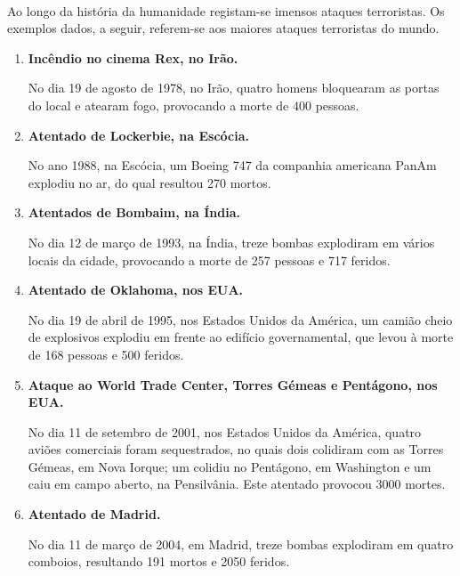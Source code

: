 \documentclass{report}
\begin{document}
\paragraph{} Ao longo da história da humanidade registam-se imensos ataques terroristas. Os exemplos dados, a seguir, referem-se aos maiores ataques terroristas do mundo.\par
\begin{enumerate}
 \item \textbf{Incêndio no cinema Rex, no Irão.} 
 
No dia 19 de agosto de 1978, no Irão, quatro homens bloquearam as portas do local e atearam fogo, provocando a morte de 400 pessoas.
\\
  
 \item \textbf{Atentado de Lockerbie, na Escócia.}
 
No ano 1988, na Escócia, um Boeing 747 da companhia americana PanAm explodiu no ar, do qual resultou 270 mortos.
\\

 \item \textbf{Atentados de Bombaim, na Índia.}
 
No dia 12 de março de 1993, na Índia, treze bombas explodiram em vários locais da cidade, provocando a morte de 257 pessoas e 717 feridos.
\\
 
 \item \textbf{Atentado de Oklahoma, nos EUA.}
 
No dia 19 de abril de 1995, nos Estados Unidos da América, um camião cheio de explosivos explodiu em frente ao edifício governamental, que levou à morte de 168 pessoas e 500 feridos.
\\
 	
 \item \textbf{Ataque ao World Trade Center, Torres Gémeas e Pentágono,
nos EUA.
}	

No dia 11 de setembro de 2001, nos Estados Unidos da América, quatro aviões comerciais foram sequestrados, no quais dois colidiram com as Torres Gémeas, em Nova Iorque; um colidiu no Pentágono, em Washington e um caiu em campo aberto, na Pensilvânia. Este atentado provocou 3000 mortes.
\\

 \item \textbf{Atentado de Madrid.}
 
No dia 11 de março de 2004, em Madrid, treze bombas explodiram em quatro comboios, resultando 191 mortos e 2050 feridos.
\\


\end{enumerate}
\end{document}
